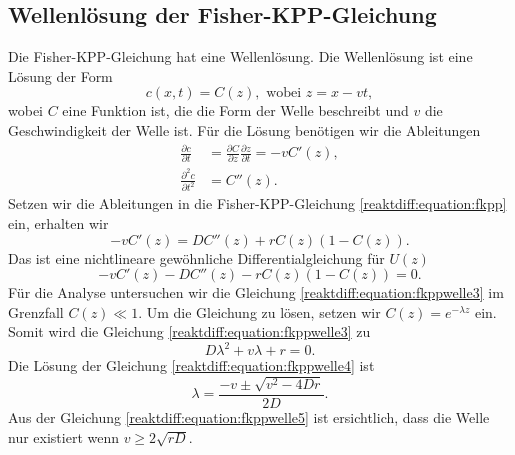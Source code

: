 \subsection{Wellenlösung der Fisher-KPP-Gleichung
\label{reaktdiff:subsection:fkppwelle}}
Die Fisher-KPP-Gleichung hat eine Wellenlösung.
Die Wellenlösung ist eine Lösung der Form
\begin{equation}
\label{reaktdiff:equation:fkppwelle}
c(x,t) = C(z), \text{ wobei } z = x - vt,
\end{equation}
wobei \(C\) eine Funktion ist, die die Form der Welle beschreibt und \(v\) die Geschwindigkeit der Welle ist.
Für die Lösung benötigen wir die Ableitungen
\begin{align*}
\frac{\partial c}{\partial t} &= \frac{\partial C}{\partial z}\frac{\partial z}{\partial t} = -vC'(z),
\\
\frac{\partial^2 c}{\partial t^2} &= C''(z).
\end{align*}
Setzen wir die Ableitungen in die Fisher-KPP-Gleichung \ref{reaktdiff:equation:fkpp} ein, erhalten wir
\begin{equation}
\label{reaktdiff:equation:fkppwelle2}
-vC'(z) = D C''(z) + rC(z)(1-C(z)).
\end{equation}
Das ist eine nichtlineare gewöhnliche Differentialgleichung für \(U(z)\)
\begin{equation}
    \label{reaktdiff:equation:fkppwelle3}
    -vC'(z) - D C''(z) - rC(z)(1-C(z)) = 0.
\end{equation}
Für die Analyse untersuchen wir die Gleichung \ref{reaktdiff:equation:fkppwelle3} im Grenzfall \(C(z) \ll 1\).
Um die Gleichung zu lösen, setzen wir \(C(z) = e^{-\lambda z}\) ein.
Somit wird die Gleichung \ref{reaktdiff:equation:fkppwelle3} zu
\begin{equation}
\label{reaktdiff:equation:fkppwelle4}
D\lambda^2 + v\lambda + r = 0.
\end{equation}
Die Lösung der Gleichung \ref{reaktdiff:equation:fkppwelle4} ist
\begin{equation}
\label{reaktdiff:equation:fkppwelle5}
\lambda = \frac{-v \pm \sqrt{v^2 - 4Dr}}{2D}.
\end{equation}
Aus der Gleichung \ref{reaktdiff:equation:fkppwelle5} ist ersichtlich, dass die Welle nur existiert wenn \(v \ge 2\sqrt{rD}\).

